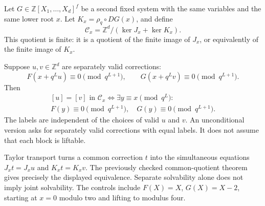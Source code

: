 Let \(G\in\mathbb Z[X_1,\ldots,X_d]^f\) be a second fixed system with
the same variables and the same lower root \(x\). Let
\(K_x=\rho_q\circ DG(x)\), and define \[
\mathcal C_x=\mathbb Z^d/(\ker J_x+\ker K_x).
\] This quotient is finite: it is a quotient of the finite image of
\(J_x\), or equivalently of the finite image of \(K_x\).

Suppose \(u,v\in\mathbb Z^d\) are separately valid corrections: \[
F(x+q^Lu)\equiv0\pmod{q^{L+1}},
\qquad
G(x+q^Lv)\equiv0\pmod{q^{L+1}}.
\] Then \[
\boxed{
\begin{gathered}
[u]=[v]\text{ in }\mathcal C_x
\iff
\exists y\equiv x\pmod{q^L}:\\
F(y)\equiv0\pmod{q^{L+1}},\quad G(y)\equiv0\pmod{q^{L+1}}.
\end{gathered}
}
\] The labels are independent of the choices of valid \(u\) and \(v\).
An unconditional version asks for separately valid corrections with
equal labels. It does not assume that each block is liftable.

Taylor transport turns a common correction \(t\) into the simultaneous
equations \(J_xt=J_xu\) and \(K_xt=K_xv\). The previously checked
common-quotient theorem gives precisely the displayed equivalence.
Separate solvability alone does not imply joint solvability. The
controls include \(F(X)=X\), \(G(X)=X-2\), starting at \(x=0\) modulo
two and lifting to modulus four.
